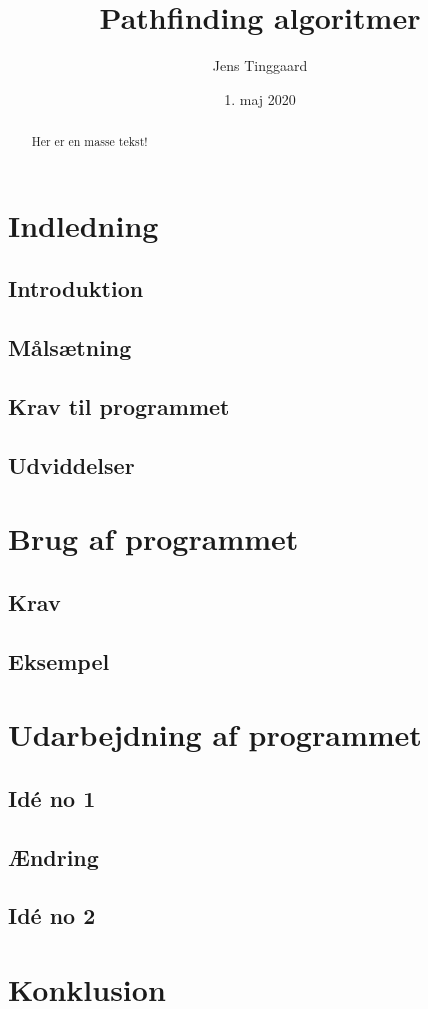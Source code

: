 \documentclass[a4paper, 12pt]{article}
\date{1. maj 2020}
\title{Pathfinding algoritmer}
\author{Jens Tinggaard}
\begin{document}
\thispagestyle{empty}
\maketitle

\begin{abstract}
  Her er en masse tekst!
\end{abstract}

\tableofcontents


\newpage
\section{Indledning}

\subsection{Introduktion}
\subsection{Målsætning}
\subsection{Krav til programmet}
\subsection{Udviddelser}


\newpage
\section{Brug af programmet}
\subsection{Krav}
\subsection{Eksempel}


\newpage
\section{Udarbejdning af programmet}

\subsection{Idé no 1}
\subsection{Ændring}
\subsection{Idé no 2}

\newpage
\section{Konklusion}




\newpage
\begin{appendices}
\end{appendices}
\end{document}
